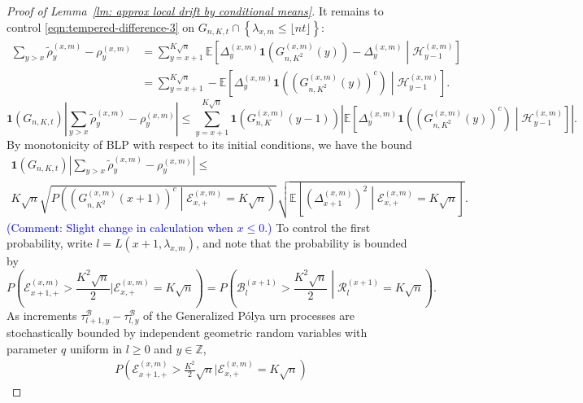 \documentclass[twoside,12pt, a4paper]{article}
\numberwithin{equation}{section}
\theoremstyle{remark}
\newcommand{\comment}[1]{\textcolor{blue}{(Comment: #1)}}
\begin{document}
\begin{proof}[Proof of Lemma~\ref{lm: approx local drift by conditional means}]
		It remains to control  \eqref{eqn:tempered-difference-3} on $G_{n, K, t} \cap \left\{\lambda_{x,m} \leq\lfloor nt \rfloor \right\}$:
		\begin{align*}
			\sum_{y > x} \tilde\rho_y^{(x,m)} - \rho_y^{(x,m)}
			&= \sum_{y = x + 1}^{K \sqrt{n} } \mathbb{E}\left[ \Delta_y^{(x,m)}\mathbf{1}\left( G_{n, K^2}^{(x,m)}(y) \right) - \Delta_{y}^{(x,m)} \middle| \mathcal{H}_{y-1}^{(x,m)}  \right]  \\
			&= \sum_{y = x + 1}^{K \sqrt{n} } -\mathbb{E}\left[ \Delta_y^{(x,m)}\mathbf{1}\left( \left( G_{n, K^2}^{(x,m)}(y) \right) ^c \right) \middle| \mathcal{H}_{y-1}^{(x,m)}  \right]
			.\end{align*}
		\[
			\mathbf{1}(G_{n, K, t}) \left| 
			\sum_{y > x} \tilde\rho_y^{(x,m)} - \rho_y^{(x,m)}
			\right| 
			\le  \sum_{y = x + 1}^{K \sqrt{n} } \mathbf{1}\left(G_{n, K}^{(x,m)}(y-1)\right) 
			\left|  \mathbb{E}\left[ \Delta_y^{(x,m)}\mathbf{1}\left( \left( G_{n, K^2}^{(x,m)}(y) \right) ^c \right) \middle| \mathcal{H}_{y-1}^{(x,m)}  \right] \right| 
		.\] 
		By monotonicity of BLP with respect to its initial conditions, we have the bound
		\begin{multline*}
			\mathbf{1}(G_{n, K, t})
			\left| \sum_{y > x} \tilde\rho_y^{(x,m)} - \rho_y^{(x,m)} \right| \le \\
			K \sqrt{n} 
			\sqrt{ P\left( \left( G^{(x,m)}_{n, K^2}(x+1) \right) ^{c} \middle| \mathcal{E}_{x,+}^{(x,m)} = K \sqrt{n}  \right) }
			\sqrt{ \mathbb{E}\left[ \left(\Delta_{x+1}^{(x,m)}\right)^2 \middle| \mathcal{E}_{x,+}^{(x,m)} = K \sqrt{n}  \right]}
			.\end{multline*}
		\comment{Slight change in calculation when $x\leq 0$.}
		To control the first probability, write $l = L\left( x+1, \lambda_{x, m} \right) $, and note that the probability is bounded by 
		\[
		P\left(\mathcal{E}_{x+1,+}^{(x,m)} > \frac{K^2 \sqrt{n} }{2} | \mathcal{E}_{x,+}^{(x, m)} = K \sqrt{n}\right)
		= P\left(\mathcal{B}^{(x+1)}_{l} > \frac{K^2 \sqrt{n} }{2}  \middle| \mathcal{R}^{(x + 1)}_l = K \sqrt{n}  \right)
		.\] 
		As increments $\tau^{\mathcal{B}}_{l+1,y} -\tau^{\mathcal{B}}_{l,y}$ of the Generalized P\'{o}lya urn processes are stochastically bounded by independent geometric random variables with parameter $q$ uniform in $l\geq 0$ and $y \in \mathbb{Z}$, 
		\begin{align*}
			P(\mathcal{E}_{x+1,+}^{(x,m)} > \frac{K^2}{2} \sqrt{n} | \mathcal{E}_{x,+}^{(x, m)} = K \sqrt{n})

\end{align*}
\end{proof}
\end{document}
